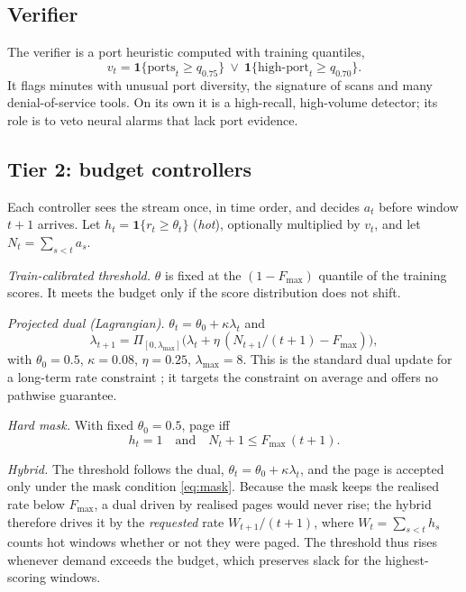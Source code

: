 \documentclass[journal,10pt,twocolumn]{IEEEtran}
\newcommand{\Fmax}{F_{\max}}
\begin{document}
\subsection{Verifier}
The verifier is a port heuristic computed with training quantiles,
\begin{equation}
v_t=\mathbf{1}\{\text{ports}_t\ge q_{0.75}\}\ \vee\ \mathbf{1}\{\text{high-port}_t\ge q_{0.70}\}.
\end{equation}
It flags minutes with unusual port diversity, the signature of scans and many denial-of-service tools. On its own it is a high-recall, high-volume detector; its role is to veto neural alarms that lack port evidence.

\subsection{Tier 2: budget controllers}
Each controller sees the stream once, in time order, and decides $a_t$ before window $t+1$ arrives. Let $h_t=\mathbf{1}\{r_t\ge\theta_t\}$ (\emph{hot}), optionally multiplied by $v_t$, and let $N_t=\sum_{s<t}a_s$.

\emph{Train-calibrated threshold.} $\theta$ is fixed at the $(1-\Fmax)$ quantile of the training scores. It meets the budget only if the score distribution does not shift.

\emph{Projected dual (Lagrangian).} $\theta_t=\theta_0+\kappa\lambda_t$ and
\begin{equation}
\lambda_{t+1}=\Pi_{[0,\lambda_{\max}]}\bigl(\lambda_t+\eta\,(N_{t+1}/(t+1)-\Fmax)\bigr),
\end{equation}
with $\theta_0=0.5$, $\kappa=0.08$, $\eta=0.25$, $\lambda_{\max}=8$. This is the standard dual update for a long-term rate constraint \cite{mahdavi2012longterm,tessler2019rcpo}; it targets the constraint on average and offers no pathwise guarantee.

\emph{Hard mask.} With fixed $\theta_0=0.5$, page iff
\begin{equation}
h_t=1\quad\text{and}\quad N_t+1\le\Fmax\,(t+1).
\label{eq:mask}
\end{equation}

\emph{Hybrid.} The threshold follows the dual, $\theta_t=\theta_0+\kappa\lambda_t$, and the page is accepted only under the mask condition \eqref{eq:mask}. Because the mask keeps the realised rate below $\Fmax$, a dual driven by realised pages would never rise; the hybrid therefore drives it by the \emph{requested} rate $W_{t+1}/(t+1)$, where $W_t=\sum_{s<t}h_s$ counts hot windows whether or not they were paged. The threshold thus rises whenever demand exceeds the budget, which preserves slack for the highest-scoring windows.
\end{document}
